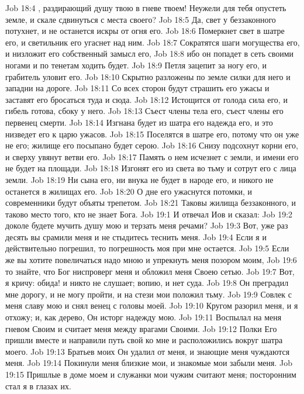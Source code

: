 \vs Job 18:4 , раздирающий душу твою в гневе твоем! Неужели для тебя опустеть земле, и скале сдвинуться с места своего?
\vs Job 18:5 Да, свет у беззаконного потухнет, и не останется искры от огня его.
\vs Job 18:6 Померкнет свет в шатре его, и светильник его угаснет над ним.
\vs Job 18:7 Сократятся шаги могущества его, и низложит его собственный замысл его,
\vs Job 18:8 ибо он попадет в сеть своими ногами и по тенетам ходить будет.
\vs Job 18:9 Петля зацепит за ногу его, и грабитель уловит его.
\vs Job 18:10 Скрытно разложены по земле силки для него и западни на дороге.
\vs Job 18:11 Со всех сторон будут страшить его ужасы и заставят его бросаться туда и сюда.
\vs Job 18:12 Истощится от голода сила его, и гибель готова, сбоку у него.
\vs Job 18:13 Съест члены тела его, съест члены его первенец смерти.
\vs Job 18:14 Изгнана будет из шатра его надежда его, и это низведет его к царю ужасов.
\vs Job 18:15 Поселятся в шатре его, потому что он уже не его; жилище его посыпано будет серою.
\vs Job 18:16 Снизу подсохнут корни его, и сверху увянут ветви его.
\vs Job 18:17 Память о нем исчезнет с земли, и имени его не будет на площади.
\vs Job 18:18 Изгонят его из света во тьму и сотрут его с лица земли.
\vs Job 18:19 Ни сына его, ни внука не будет в народе его, и никого не останется в жилищах его.
\vs Job 18:20 О дне его ужаснутся потомки, и современники будут объяты трепетом.
\vs Job 18:21 Таковы жилища беззаконного, и таково место того, кто не знает Бога.
\vs Job 19:1 И отвечал Иов и сказал:
\vs Job 19:2 доколе будете мучить душу мою и терзать меня речами?
\vs Job 19:3 Вот, уже раз десять вы срамили меня и не стыдитесь теснить меня.
\vs Job 19:4 Если я и действительно погрешил, то погрешность моя при мне остается.
\vs Job 19:5 Если же вы хотите повеличаться надо мною и упрекнуть меня позором моим,
\vs Job 19:6 то знайте, что Бог ниспроверг меня и обложил меня Своею сетью.
\vs Job 19:7 Вот, я кричу: обида! и никто не слушает; вопию, и нет суда.
\vs Job 19:8 Он преградил мне дорогу, и не могу пройти, и на стези мои положил тьму.
\vs Job 19:9 Совлек с меня славу мою и снял венец с головы моей.
\vs Job 19:10 Кругом разорил меня, и я отхожу; и, как дерево, Он исторг надежду мою.
\vs Job 19:11 Воспылал на меня гневом Своим и считает меня между врагами Своими.
\vs Job 19:12 Полки Его пришли вместе и направили путь свой ко мне и расположились вокруг шатра моего.
\vs Job 19:13 Братьев моих Он удалил от меня, и знающие меня чуждаются меня.
\vs Job 19:14 Покинули меня близкие мои, и знакомые мои забыли меня.
\vs Job 19:15 Пришлые в доме моем и служанки мои чужим считают меня; посторонним стал я в глазах их.
